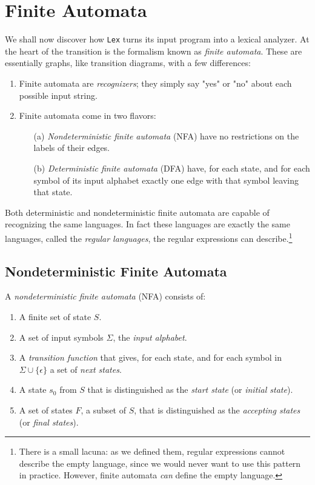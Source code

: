 \documentclass[a4paper,twoside]{book}
\begin{document}
\section{Finite Automata}
We shall now discover how \verb|Lex| turns its input program into a lexical analyzer. At the heart of the transition is the formalism known as \textit{finite automata}. These are essentially graphs, like transition diagrams, with a few differences:
\begin{enumerate}
    \item Finite automata are \textit{recognizers};  they simply say "yes" or "no" about each possible input string.
    \item Finite automata come in two flavors:
    \begin{itemize}
        \item[(a)]\textit{Nondeterministic finite automata} (NFA) have no restrictions on the labels of their edges.
        \item[(b)]\textit{Deterministic finite automata} (DFA) have, for each state, and for each symbol of its input alphabet exactly one edge with that symbol leaving that state.
    \end{itemize}
\end{enumerate}

Both deterministic and nondeterministic finite automata are capable of recognizing the same languages. In fact these languages are exactly the same languages, called the \textit{regular languages}, the regular expressions can describe.\footnote{There is a small lacuna: as we defined them, regular expressions cannot describe the empty language, since we would never want to use this pattern in practice. However, finite automata \textit{can} define the empty language.}

\subsection{Nondeterministic Finite Automata}

A \textit{nondeterministic finite automata} (NFA) consists of:
\begin{enumerate}
    \item A finite set of state $S$.
    \item A set of input symbols $\Sigma$, the \textit{input alphabet}.
    \item A \textit{transition function} that gives, for each state, and for each symbol in $\Sigma\cup\{\epsilon\}$ a set of \textit{next states}.
    \item A state $s_0$ from $S$ that is distinguished as the \textit{start state} (or \textit{initial state}).
    \item A set of states $F$, a subset of $S$, that is distinguished as the \textit{accepting states} (or \textit{final states}).
\end{enumerate}
 
\end{document}
